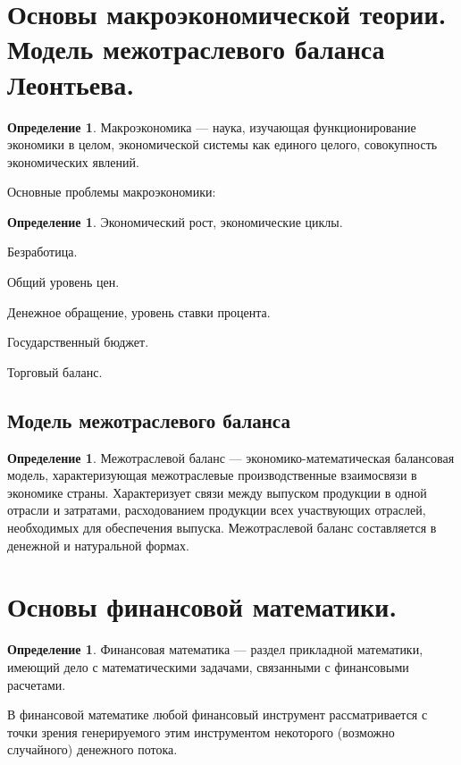 \documentclass[12pt]{report}
\theoremstyle{definition}
\newtheorem{definition}[theorem]{Определение}
\begin{document}

\section
{
  Основы макроэкономической теории.
  Модель межотраслевого баланса Леонтьева.
}

\begin{definition}
Макроэкономика --- наука, изучающая функционирование экономики в целом,
экономической системы как единого целого, совокупность экономических явлений.
\end{definition}

Основные проблемы макроэкономики:
\begin{definition}
\item Экономический рост, экономические циклы.
\item Безработица.
\item Общий уровень цен.
\item Денежное обращение, уровень ставки процента.
\item Государственный бюджет.
\item Торговый баланс.
\end{definition}

\subsection{Модель межотраслевого баланса}
\begin{definition}
Межотраслевой баланс --- экономико-математическая балансовая модель,
характеризующая межотраслевые производственные взаимосвязи в экономике страны.
Характеризует связи между выпуском продукции в одной отрасли и затратами,
расходованием продукции всех участвующих отраслей, необходимых для обеспечения
выпуска. Межотраслевой баланс составляется в денежной и натуральной формах.
\end{definition}


\section
{
  Основы финансовой математики.
}

\begin{definition}
Финансовая математика --- раздел прикладной математики, имеющий дело с
математическими задачами, связанными с финансовыми расчетами.

В финансовой математике любой финансовый инструмент рассматривается с
точки зрения генерируемого этим инструментом некоторого (возможно случайного)
денежного потока.
\end{definition}
\end{document}
